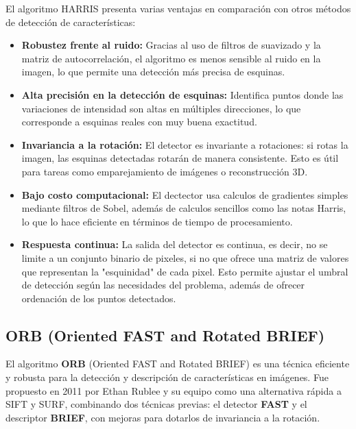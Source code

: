 \documentclass[a4paper]{article}
\begin{document}
  El algoritmo HARRIS presenta varias ventajas en comparación con otros métodos de detección de características:
  
  \begin{itemize}
      \item \textbf{Robustez frente al ruido:}  
      Gracias al uso de filtros de suavizado y la matriz de autocorrelación, el algoritmo es menos sensible al ruido en la imagen, lo que permite una detección más precisa de esquinas.
      
      \item \textbf{Alta precisión en la detección de esquinas:}  
      Identifica puntos donde las variaciones de intensidad son altas en múltiples direcciones, lo que corresponde a esquinas reales con muy buena exactitud.
      
      \item \textbf{Invariancia a la rotación:}  
      El detector es invariante a rotaciones: si rotas la imagen, las esquinas detectadas rotarán de manera consistente. Esto es útil para tareas como emparejamiento de imágenes o reconstrucción 3D.
      
      \item \textbf{Bajo costo computacional:}  
      El dectector usa calculos de gradientes simples mediante filtros de Sobel, además de calculos sencillos como las notas Harris, lo que lo hace eficiente en términos de tiempo de procesamiento.
      
      \item \textbf{Respuesta continua:}
      La salida del detector es continua, es decir, no se limite a un conjunto binario de pixeles, si no que ofrece una matriz
      de valores que representan la "esquinidad" de cada pixel. Esto permite ajustar el umbral de detección según las necesidades del problema, además de ofrecer ordenación de los puntos detectados.  
    \end{itemize}
  
  \par\vspace{0.5cm}


  \subsection{ORB (Oriented FAST and Rotated BRIEF)}
  \par\vspace{0.5cm}
    El algoritmo \textbf{ORB} (Oriented FAST and Rotated BRIEF) es una técnica eficiente y robusta para la detección y descripción de características en imágenes. Fue propuesto en 2011 por Ethan Rublee y su equipo como una alternativa rápida a SIFT y SURF, combinando dos técnicas previas: el detector \textbf{FAST} y el descriptor \textbf{BRIEF}, con mejoras para dotarlos de invariancia a la rotación.
\end{document}
